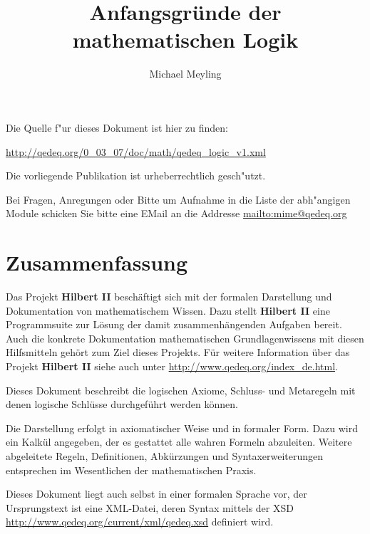 \documentclass[a4paper,german,10pt,twoside]{book}
\title{Anfangsgr{\"u}nde der mathematischen Logik}
\author{
Michael Meyling
}
\theoremstyle{definition}
\theoremstyle{remark}
\begin{document}
\maketitle

\setlength{\parskip}{5pt plus 2pt minus 1pt}
\mbox{}
\vfill

\par
Die Quelle f{"ur} dieses Dokument ist hier zu finden:
\par
\url{http://qedeq.org/0_03_07/doc/math/qedeq_logic_v1.xml}

\par
Die vorliegende Publikation ist urheberrechtlich gesch{"u}tzt.
\par
Bei Fragen, Anregungen oder Bitte um Aufnahme in die Liste der abh{"a}ngigen Module schicken Sie bitte eine EMail an die Addresse \url{mailto:mime@qedeq.org}

\setlength{\parskip}{0pt}
\tableofcontents

\setlength{\parskip}{5pt plus 2pt minus 1pt}

\chapter*{Zusammenfassung} \label{chapter0} \hypertarget{chapter0}{}

Das Projekt \textbf{Hilbert II} besch{\"a}ftigt sich mit der formalen Darstellung und Dokumentation 
von mathematischem Wissen. Dazu stellt \textbf{Hilbert II} eine Programmsuite zur L{\"o}sung 
der damit zusammenh{\"a}ngenden Aufgaben bereit. Auch die konkrete Dokumentation mathematischen Grundlagenwissens 
mit diesen Hilfsmitteln geh{\"o}rt zum Ziel dieses Projekts. 
F{\"u}r weitere Information {\"u}ber das Projekt \textbf{Hilbert II} siehe auch unter
\url{http://www.qedeq.org/index_de.html}.

\par
Dieses Dokument beschreibt die logischen Axiome, Schluss- und Metaregeln mit denen logische
Schl{\"u}sse durchgef{\"u}hrt werden k{\"o}nnen.

\par
Die Darstellung erfolgt in axiomatischer Weise und in formaler Form. Dazu wird ein Kalk{\"u}l
angegeben, der es gestattet alle wahren Formeln abzuleiten. Weitere abgeleitete Regeln,
Definitionen, Abk{\"u}rzungen und Syntaxerweiterungen entsprechen im Wesentlichen der mathematischen
Praxis.

\par
Dieses Dokument liegt auch selbst in einer formalen Sprache vor, der Ursprungstext ist eine XML-Datei, deren Syntax mittels der XSD \url{http://www.qedeq.org/current/xml/qedeq.xsd} definiert wird.
\end{document}
